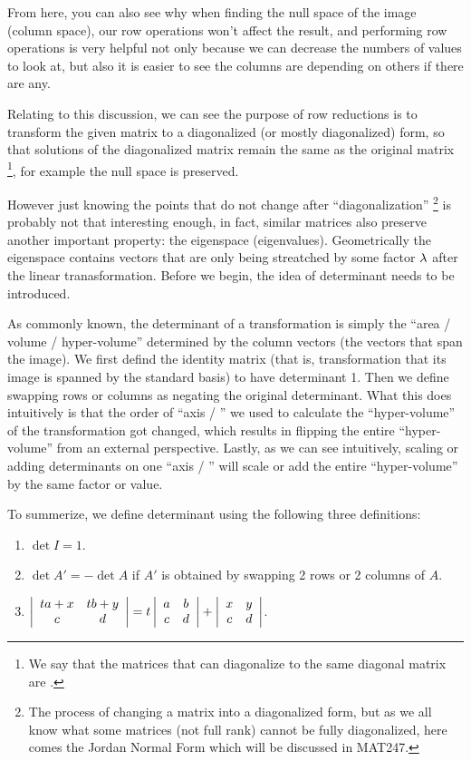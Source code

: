 \documentclass[11pt, cyan, night, 1in]{LatexTemplate/hw}
\begin{document}
From here, you can also see why when finding the null space of the image (column space), our row operations won't affect the result, and performing row operations is very helpful not only because we can decrease the numbers of values to look at, but also it is easier to see  the columns are depending on others if there are any.

Relating to this discussion, we can see the purpose of row reductions is to transform the given matrix to a diagonalized (or mostly diagonalized) form, so that  solutions of the diagonalized matrix remain the same as the original matrix \footnote{We say that the matrices that can diagonalize to the same diagonal matrix are .}, for example the null space is preserved. 

However just knowing the points that do not change after ``diagonalization'' \footnote{The process of changing a matrix into a diagonalized form, but as we all know what some matrices (not full rank) cannot be fully diagonalized, here comes the Jordan Normal Form which will be discussed in MAT247.} is probably not that interesting enough, in fact, similar matrices also preserve another important property: the eigenspace (eigenvalues). Geometrically the eigenspace contains vectors that are only being streatched by some factor $\lambda$ after the linear tranasformation. Before we begin, the idea of determinant needs to be introduced.

As commonly known, the determinant of a transformation is simply the ``area / volume / hyper-volume'' determined by the column vectors (the vectors that span the image). We first defind the identity matrix (that is, transformation that its image is spanned by the standard basis) to have determinant 1. Then we define swapping rows or columns as negating the original determinant. What this does intuitively is that the order of ``axis / '' we used to calculate the ``hyper-volume'' of the transformation got changed, which results in flipping the entire ``hyper-volume'' from an external perspective. Lastly, as we can see intuitively, scaling or adding determinants on one ``axis / '' will scale or add the entire ``hyper-volume'' by the same factor or value.

To summerize, we define determinant using the following three definitions:
\begin{enumerate}
    \item $\det I = 1$.
    \item $\det A' = - \det A$ if $A'$ is obtained by swapping 2 rows or 2 columns of $A$.
    \item $\left|\begin{array}{cc}
        ta+x & tb+y\\
        c & d
    \end{array}\right| = t\left|\begin{array}{cc}
        a & b\\
        c & d
    \end{array}\right| + \left|\begin{array}{cc}
        x & y\\
        c & d
    \end{array}\right|$.
\end{enumerate}
\end{document}
